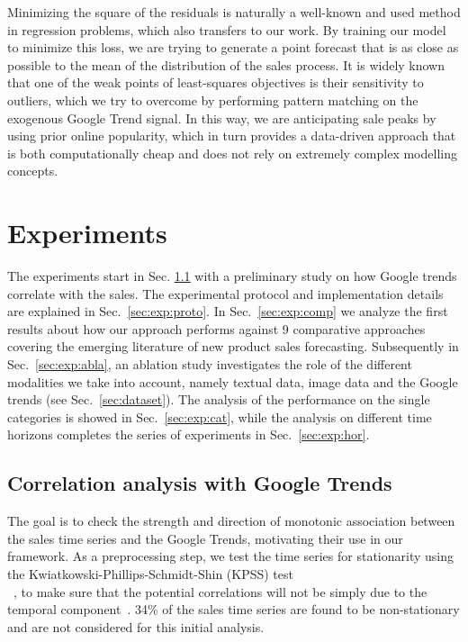 \documentclass{article}
\begin{document}
Minimizing the square of the residuals is naturally a well-known and used method in regression problems, which also transfers to our work. By training our model to minimize this loss, we are trying to generate a point forecast that is as close as possible to the mean of the distribution of the sales process. It is widely known that one of the weak points of least-squares objectives is their sensitivity to outliers, which we try to overcome by performing pattern matching on the exogenous Google Trend signal. In this way, we are anticipating sale peaks by using prior online popularity, which in turn provides a data-driven approach that is both computationally cheap and does not rely on extremely complex modelling concepts. 
\section{Experiments}\label{sec:exp}
The experiments start in Sec. \ref{sec:exp:corr} with a preliminary study on how Google trends correlate with the sales. The experimental protocol and implementation details are explained in Sec.~\ref{sec:exp:proto}. In Sec.~\ref{sec:exp:comp} we analyze the first results about how our approach performs against 9 comparative approaches covering the emerging literature of new product sales forecasting. Subsequently in Sec.~\ref{sec:exp:abla}, an ablation study investigates the role of the different modalities we take into account, namely  textual data, image data and the Google trends (see Sec.~\ref{sec:dataset}). The analysis of the performance on the single categories is showed in Sec.~\ref{sec:exp:cat}, while the analysis on different time horizons completes the series of experiments in Sec.~\ref{sec:exp:hor}.    

\subsection{Correlation analysis with Google Trends}\label{sec:exp:corr}
The goal is to check the strength and direction of monotonic association between the sales time series and the Google Trends, motivating their use in our framework. As a preprocessing step, we test the time series for stationarity using the Kwiatkowski-Phillips-Schmidt-Shin (KPSS) test\\~\cite{KPSS}, to make sure that the potential correlations will not be simply due to the temporal component~\cite{aldrich1995correlations}. 34\% of the sales time series are found to be non-stationary and are not considered for this initial analysis.
\end{document}

